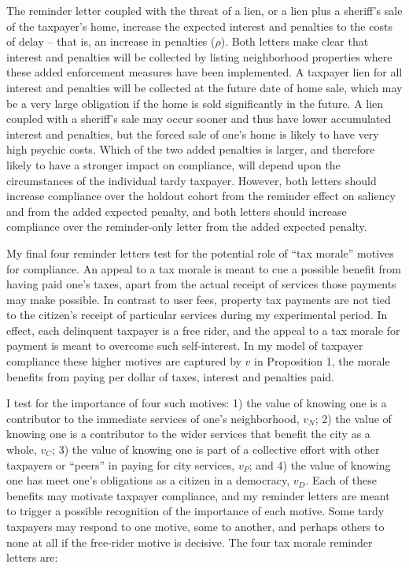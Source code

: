 \bigskip

The reminder letter coupled with the threat of a lien, or a lien plus
a sheriff's sale of the taxpayer's home, increase the expected
interest and penalties to the costs of delay -- that is, an increase
in penalties ($\rho$).  Both letters make clear that interest and
penalties will be collected by listing neighborhood properties where
these added enforcement measures have been implemented.  A taxpayer
lien for all interest and penalties will be collected at the future
date of home sale, which may be a very large obligation if the home is
sold significantly in the future.  A lien coupled with a sheriff's
sale may occur sooner and thus have lower accumulated interest and
penalties, but the forced sale of one's home is likely to have very
high psychic costs.  Which of the two added penalties is larger, and
therefore likely to have a stronger impact on compliance, will depend
upon the circumstances of the individual tardy taxpayer.
However, both letters should increase compliance over the holdout
cohort from the reminder effect on saliency and from the added
expected penalty, and both letters should increase compliance over the
reminder-only letter from the added expected penalty.

My final four reminder letters test for the potential role of ``tax
morale'' motives for compliance.  An appeal to a tax morale is meant
to cue a possible benefit from having paid one's taxes, apart from the
actual receipt of services those payments may make possible.  In
contrast to user fees, property tax payments are not tied to the
citizen's receipt of particular services during my experimental
period.  In effect, each delinquent taxpayer is a free rider, and the
appeal to a tax morale for payment is meant to overcome such
self-interest.  In my model of taxpayer compliance these higher
motives are captured by $v$ in Proposition 1, the morale benefits
from paying per dollar of taxes, interest and penalties paid.

I test for the importance of four such motives: 1) the value of
knowing one is a contributor to the immediate services of one's
neighborhood, $v_{N}$; 2) the value of knowing one is a contributor to
the wider services that benefit the city as a whole, $v_{C}$; 3) the
value of knowing one is part of a collective effort with other
taxpayers or ``peers'' in paying for city services, $v_{P}$; and 4)
the value of knowing one has meet one's obligations as a citizen in a
democracy, $v_{D}$.  Each of these benefits may motivate taxpayer
compliance, and my reminder letters are meant to trigger a possible
recognition of the importance of each motive.  Some tardy
taxpayers may respond to one motive, some to another, and perhaps
others to none at all if the free-rider motive is decisive.  The four
tax morale reminder letters are:

